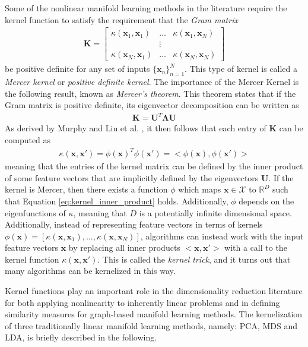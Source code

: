 Some of the nonlinear manifold learning methods in the literature require the kernel function to satisfy the requirement that the \textit{Gram matrix}
\begin{align}
	\bm{K} = 	
	\begin{bmatrix}
		\kappa(\bm{x}_{1},\bm{x}_{1}) &  \dots & \kappa(\bm{x}_{1},\bm{x}_{N}) \\
		 & \vdots  & \\
		\kappa(\bm{x}_{N},\bm{x}_{1}) & \dots & \kappa(\bm{x}_{N},\bm{x}_{N})
	\end{bmatrix}
\end{align}
\noindent
be positive definite for any set of inputs $\{\bm{x}_{n}\}_{n=1}^{N}$.  This type of kernel is called a \textit{Mercer kernel} or \textit{positive definite kernel}.  The importance of the Mercer Kernel is the following result, known as \textit{Mercer's theorem}.  This theorem states that if the Gram matrix is positive definite, its eigenvector decomposition can be written as
\begin{align}
	\bm{K} = \bm{U}^{T}\bm{\Lambda}\bm{U}
\end{align}
As derived by Murphy and Liu et al. \citep{Murphy2012,Liu2010KernelAdaptiveFiltering}, it then follows that each entry of $\bm{K}$ can be computed as 
\begin{align}
	\kappa(\bm{x},\bm{x}') = \phi(\bm{x})^{T}\phi(\bm{x}') = <\phi(\bm{x}),\phi(\bm{x}')>
	\label{eq:kernel_inner_product}
\end{align}
meaning that the entries of the kernel matrix can be defined by the inner product of some feature vectors that are implicitly defined by the eigenvectors $\bm{U}$.  If the kernel is Mercer, then there exists a function $\phi$ which maps $\bm{x} \in \mathcal{X}$ to $\mathbb{R}^{D}$ such that Equation \ref{eq:kernel_inner_product} holds.  Additionally, $\phi$ depends on the eigenfunctions of $\kappa$, meaning that $D$ is a potentially infinite dimensional space.
Additionally, instead of representing feature vectors in terms of kernels $\phi(\bm{x}) = [\kappa(\bm{x},\bm{x}_{1}), \dots, \kappa(\bm{x},\bm{x}_{N})]$, algorithms can instead work with the input feature vectors $\bm{x}$ by replacing all inner products $<\bm{x},\bm{x}'>$ with a call to the kernel function $\kappa(\bm{x},\bm{x}')$.  This is called the \textit{kernel trick}, and it turns out that many algorithms can be kernelized in this way.

Kernel functions play an important role in the dimensionality reduction literature for both applying nonlinearity to inherently linear problems and in defining similarity measures for graph-based manifold learning methods.  The kernelization of three traditionally linear manifold learning methods, namely: PCA, MDS and LDA, is briefly described in the following.

